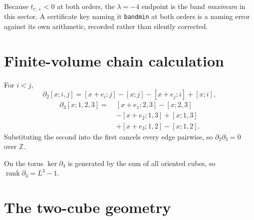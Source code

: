 \documentclass[11pt]{article}
\theoremstyle{plain}
\theoremstyle{definition}
\theoremstyle{remark}
\newcommand{\chk}[1]{}
\begin{document}
\chk{one assembly formula gives every C-even value at both orders}

Because $t_{r,+}<0$ at both orders, the $\lambda=-4$ endpoint is the band
\emph{maximum} in this sector. A certificate key naming it \texttt{bandmin} at
both orders is a naming error against its own arithmetic, recorded rather than
silently corrected.
\chk{FINDING: the certificate key 'bandmin' holds the band MAXIMUM, at both orders}

\section{Finite-volume chain calculation}\label{app:chain}

For $i<j$,
\[
  \partial_2[x;i,j]=[x+e_i;j]-[x;j]-[x+e_j;i]+[x;i],
\]
\begin{align*}
  \partial_3[x;1,2,3]=\;&[x+e_1;2,3]-[x;2,3]\\
  &-[x+e_2;1,3]+[x;1,3]\\
  &+[x+e_3;1,2]-[x;1,2].
\end{align*}
Substituting the second into the first cancels every edge pairwise, so
$\partial_2\partial_3=0$ over $\mathbb Z$.
\chk{d\_2 d\_3 = 0 on the built complex}
On the torus $\ker\partial_3$ is generated by the sum of all oriented cubes,
so $\operatorname{rank}\partial_3=L^3-1$.
\chk{rank d\_3 = L\^{}3 - 1 on the built complex}

\section{The two-cube geometry}\label{app:twocube}
\end{document}
